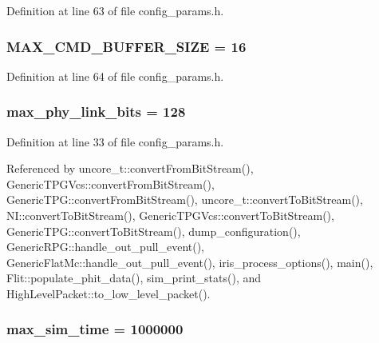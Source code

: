 Definition at line 63 of file config\_\-params.h.
\subsubsection[{MAX\_\-CMD\_\-BUFFER\_\-SIZE}]{ {\bf MAX\_\-CMD\_\-BUFFER\_\-SIZE} = 16}\label{config__params_8h_7b3f5203e83ae79d6e9c365f6286dc97}




Definition at line 64 of file config\_\-params.h.
\subsubsection[{max\_\-phy\_\-link\_\-bits}]{ {\bf max\_\-phy\_\-link\_\-bits} = 128}\label{config__params_8h_33b33b16a68e90baa8ffd7d22614fc13}




Definition at line 33 of file config\_\-params.h.

Referenced by uncore\_\-t::convertFromBitStream(), GenericTPGVcs::convertFromBitStream(), GenericTPG::convertFromBitStream(), uncore\_\-t::convertToBitStream(), NI::convertToBitStream(), GenericTPGVcs::convertToBitStream(), GenericTPG::convertToBitStream(), dump\_\-configuration(), GenericRPG::handle\_\-out\_\-pull\_\-event(), GenericFlatMc::handle\_\-out\_\-pull\_\-event(), iris\_\-process\_\-options(), main(), Flit::populate\_\-phit\_\-data(), sim\_\-print\_\-stats(), and HighLevelPacket::to\_\-low\_\-level\_\-packet().
\subsubsection[{max\_\-sim\_\-time}]{ {\bf max\_\-sim\_\-time} = 1000000}\label{config__params_8h_a340b2edbc363c0c05db68a8f5212f0f}




